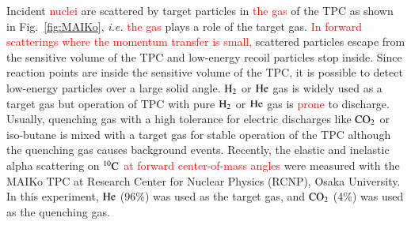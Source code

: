 \documentclass{jps-cp}
\begin{document}
Incident \textcolor{red}{nuclei} are scattered by target particles in \textcolor{red}{the gas} of the TPC as shown in Fig.~\ref{fig:MAIKo}, {\it i.e.} \textcolor{red}{the gas} plays a role of the target gas.
\textcolor{red}{In forward scatterings where the momentum transfer is small,}
scattered particles escape from the sensitive volume of the TPC and low-energy recoil particles stop inside.
Since reaction points are inside the sensitive volume of the TPC,
it is possible to detect low-energy particles over a large solid angle.
$\rm{H}_{2}$ or $\rm{He}$ gas is widely used as a target gas
but operation of TPC with pure $\rm{H}_{2}$ or $\rm{He}$ gas is \textcolor{red}{prone} to discharge.
Usually, quenching gas with a high tolerance for electric discharges
like $\rm{CO}_{2}$ or iso-butane is mixed with a target gas
for stable operation of the TPC although the quenching gas causes background events.
Recently, the elastic and inelastic alpha scattering on ${}^{10}\rm{C}$ \textcolor{red}{at forward center-of-mass angles}
were measured with the MAIKo TPC at Research Center for Nuclear Physics (RCNP), Osaka University.
In this experiment, $\rm{He}$ (96\%) was used as the target gas, and $\rm{CO}_{2}$ (4\%) was used as the quenching gas.
\end{document}
